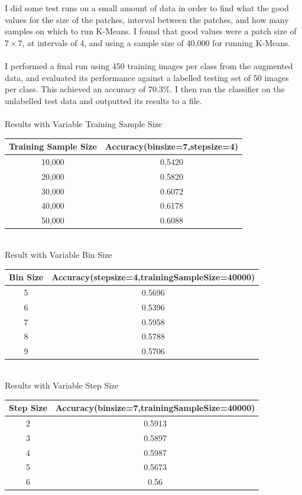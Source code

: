 \documentclass{article}
\begin{document}
	I did some test runs on a small amount of data in order to find what the good values for the size of the patches, interval between the patches, and how many samples on which to run K-Means. I found that good values were a patch size of $7\times7$, at intervals of 4, and using  a sample size of 40,000 for running K-Means. \\
	\\
	I performed a final run using 450 training images per class from the augmented data, and evaluated its performance against a labelled testing set of 50 images per class. This achieved an accuracy of 70.3\%. I then ran the classifier on the unlabelled test data and outputted its results to a file.\\
	\\Results with Variable Training Sample Size\\
	\centering
	\begin{tabular}{|c|c|}
		\hline
		Training Sample Size & Accuracy(binsize=7,stepsize=4)\\ \hline \hline
		10,000 & 0.5420 \\
		20,000 & 0.5820 \\
		30,000 & 0.6072 \\
		40,000 & 0.6178 \\
		50,000 & 0.6088 \\ \hline
	\end{tabular}\\
	Result with Variable Bin Size\\
	\begin{tabular}{|c|c|}
		\hline
		Bin Size & Accuracy(stepsize=4,trainingSampleSize=40000)\\ \hline \hline
		5 & 0.5696 \\
		6 & 0.5396 \\
		7 & 0.5958 \\
		8 & 0.5788 \\
		9 & 0.5706 \\ \hline
	\end{tabular}\\
	Results with Variable Step Size\\
	\begin{tabular}{|c|c|}
		\hline
		Step Size & Accuracy(binsize=7,trainingSampleSize=40000)\\ \hline \hline
		2 & 0.5913 \\
		3 & 0.5897 \\
		4 & 0.5987 \\
		5 & 0.5673 \\
		6 & 0.56 \\ \hline
	\end{tabular}
	\flushleft
\end{document}
